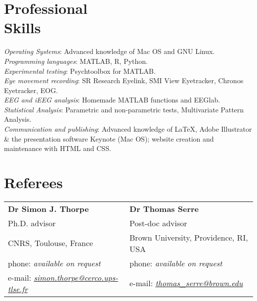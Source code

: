 \documentclass[margin,line]{resume}
\begin{document}
\begin{resume}
	\newpage	



	\vspace{3mm}
    \section{\mysidestyle Professional\\Skills}
	\textsl{Operating Systems}: Advanced knowledge of Mac OS and GNU Linux.\\
	\textsl{Programming languages}: MATLAB, R, Python.\\
	\textsl{Experimental testing}: Psychtoolbox for MATLAB.\\
	\textsl{Eye movement recording}: SR Research Eyelink, SMI View Eyetracker, Chronos Eyetracker, EOG.\\
	\textsl{EEG and iEEG analysis}: Homemade MATLAB functions and EEGlab.\\
	\textsl{Statistical Analysis}: Parametric and non-parametric tests, Multivariate Pattern Analysis.\\
	\textsl{Communication and publishing}: Advanced knowledge of \LaTeX, Adobe Illustrator \& the presentation software Keynote (Mac OS); website creation and maintenance with HTML and CSS.


	\section{\mysidestyle Referees} 

	\begin{tabular}{@{}p{6cm}p{6cm}}
	\textbf{Dr Simon J. Thorpe}       &  \textbf{Dr Thomas Serre}                   \\
	Ph.D. advisor                               &  Post-doc advisor                       \\
	CNRS, Toulouse, France          &  Brown University, Providence, RI, USA        \\
	phone: \textsl{available on request}    &  phone: \textsl{available on request}     \\
	e-mail: \textsl{\href{mailto:simon.thorpe@cerco.ups-tlse.fr}{simon.thorpe@cerco.ups-tlse.fr}}   &  
	e-mail: \textsl{\href{mailto:thomas_serre@brown.edu}{thomas\_serre@brown.edu}}    \\
	\end{tabular}
	

\end{resume}
\end{document}
